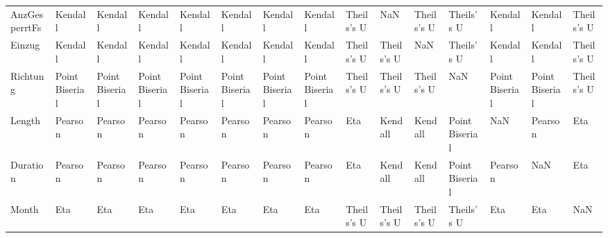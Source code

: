 \begin{tabular}{lllllllllllllll}
AnzGesperrtFs &         Kendall &         Kendall &         Kendall &         Kendall &         Kendall &         Kendall &         Kendall &  Theils's U &           NaN &  Theils's U &      Theils's U &         Kendall &         Kendall &  Theils's U \\
Einzug        &         Kendall &         Kendall &         Kendall &         Kendall &         Kendall &         Kendall &         Kendall &  Theils's U &    Theils's U &         NaN &      Theils's U &         Kendall &         Kendall &  Theils's U \\
Richtung      &  Point Biserial &  Point Biserial &  Point Biserial &  Point Biserial &  Point Biserial &  Point Biserial &  Point Biserial &  Theils's U &    Theils's U &  Theils's U &             NaN &  Point Biserial &  Point Biserial &  Theils's U \\
Length        &         Pearson &         Pearson &         Pearson &         Pearson &         Pearson &         Pearson &         Pearson &         Eta &       Kendall &     Kendall &  Point Biserial &             NaN &         Pearson &         Eta \\
Duration      &         Pearson &         Pearson &         Pearson &         Pearson &         Pearson &         Pearson &         Pearson &         Eta &       Kendall &     Kendall &  Point Biserial &         Pearson &             NaN &         Eta \\
Month         &             Eta &             Eta &             Eta &             Eta &             Eta &             Eta &             Eta &  Theils's U &    Theils's U &  Theils's U &      Theils's U &             Eta &             Eta &         NaN \\
\bottomrule
\end{tabular}
